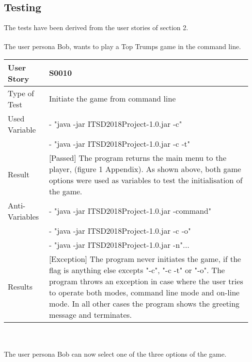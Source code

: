\subsection{Testing}

The tests have been derived from the user stories of section 2.\\
\vspace{0.1cm}\\
The user persona Bob, wants to play a Top Trumps game in the command line.    
\vspace{0.4cm}\\
\begin{tabular}{l | p{10cm}}
User Story & \textbf{S0010} \\
\hline
Type of Test & Initiate the game from command line\\
\hline
Used Variable & 
 - "java -jar ITSD2018Project-1.0.jar -c" \\
 & 
 - "java -jar ITSD2018Project-1.0.jar -c -t"
\\
\hline
Result & [Passed] The program returns the main menu to the player, (figure 1 Appendix). As shown above, both game options were used as variables to test the initialisation of the game.\\ 
\hline
Anti-Variables & - "java -jar ITSD2018Project-1.0.jar -command"\\
& - "java -jar ITSD2018Project-1.0.jar -c -o"\\
& - "java -jar ITSD2018Project-1.0.jar -n"...\\
\hline
Results & [Exception] The program never initiates the game, if the flag is anything else excepts "-c", "-c -t" or "-o". The program throws an exception in case where the user tries to operate both modes, command line mode and on-line mode. In all other cases the program shows the greeting message and terminates.\\
\hline 
\end{tabular}\\
\vspace{0.8cm}\\ 
The user persona Bob can now select one of the three options of the game.\\
\vspace{0.2cm}\\
